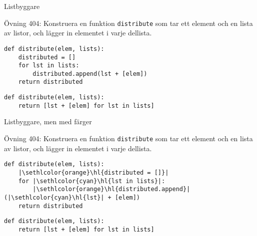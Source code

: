 \makeatletter
\let\HL\hl
\renewcommand\hl{%
  \let\set@color\beamerorig@set@color
  \let\reset@color\beamerorig@reset@color
  \HL}
\makeatother

\makeatletter
\let\UL\ul
\renewcommand\ul{%
  \let\set@color\beamerorig@set@color
  \let\reset@color\beamerorig@reset@color
  \UL}
\makeatother

\lstset{basicstyle=\ttfamily\footnotesize,language=python,escapeinside=||}

\begin{frame}[fragile]{Listbyggare}

  Övning 404: Konstruera en funktion \texttt{distribute} som tar ett element och
  en lista av listor, och lägger in elementet i varje dellista.

  \pause{}

  \begin{lstlisting}
def distribute(elem, lists):
    distributed = []
    for lst in lists:
        distributed.append(lst + [elem])
    return distributed
  \end{lstlisting}

  \pause{}

  \begin{lstlisting}
def distribute(elem, lists):
    return [lst + [elem] for lst in lists]
  \end{lstlisting}

\end{frame}

\begin{frame}[fragile]{Listbyggare, men med färger}

  Övning 404: Konstruera en funktion \texttt{distribute} som tar ett element och
  en lista av listor, och lägger in elementet i varje dellista.

  \begin{lstlisting}
def distribute(elem, lists):
    |\sethlcolor{orange}\hl{distributed = []}|
    for |\sethlcolor{cyan}\hl{lst in lists}|:
        |\sethlcolor{orange}\hl{distributed.append}|(|\sethlcolor{cyan}\hl{lst}| + [elem])
    return distributed
  \end{lstlisting}

  \begin{lstlisting}
def distribute(elem, lists):
    return [lst + [elem] for lst in lists]
  \end{lstlisting}

\end{frame}

